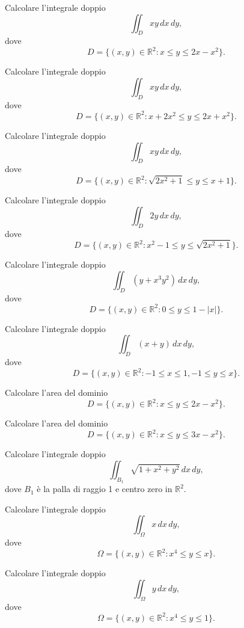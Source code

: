 \begin{exercise}
	Calcolare l'integrale doppio
	\[
	\iint_D xy \, dx \, dy,
	\]
	dove
	\[
	D = \{(x, y) \in \mathbb{R}^2 : x \leq y \leq 2x - x^2\}.
	\]
\end{exercise}
\begin{exercise}
	Calcolare l'integrale doppio
	\[
	\iint_D xy \, dx \, dy,
	\]
	dove
	\[
	D = \{(x, y) \in \mathbb{R}^2 : x + 2x^2 \leq y \leq 2x + x^2\}.
	\]
\end{exercise}
\begin{exercise}
	Calcolare l'integrale doppio
	\[
	\iint_D xy \, dx \, dy,
	\]
	dove
	\[
	D = \{(x, y) \in \mathbb{R}^2 : \sqrt{2x^2 + 1} \leq y \leq x + 1\}.
	\]
\end{exercise}
\begin{exercise}
	Calcolare l'integrale doppio
	\[
	\iint_D 2y \, dx \, dy,
	\]
	dove
	\[
	D = \{(x, y) \in \mathbb{R}^2 : x^2 - 1 \leq y \leq \sqrt{2x^2 + 1}\}.
	\]
\end{exercise}
\begin{exercise}
	Calcolare l'integrale doppio
	\[
	\iint_D (y + x^3 y^2) \, dx \, dy,
	\]
	dove
	\[
	D = \{(x, y) \in \mathbb{R}^2 : 0 \leq y \leq 1 - |x|\}.
	\]
\end{exercise}
\begin{exercise}
	Calcolare l'integrale doppio
	\[
	\iint_D (x + y) \, dx \, dy,
	\]
	dove
	\[
	D = \{(x, y) \in \mathbb{R}^2 : -1 \leq x \leq 1, -1 \leq y \leq x\}.
	\]
\end{exercise}
\begin{exercise}
	Calcolare l'area del dominio
	\[
	D = \{(x, y) \in \mathbb{R}^2 : x \leq y \leq 2x - x^2\}.
	\]
\end{exercise}
\begin{exercise}
	Calcolare l'area del dominio
	\[
	D = \{(x, y) \in \mathbb{R}^2 : x \leq y \leq 3x - x^2\}.
	\]
\end{exercise}
\begin{exercise}
	Calcolare l'integrale doppio
	\[
	\iint_{B_1} \sqrt{1 + x^2 + y^2} \, dx \, dy,
	\]
	dove \( B_1 \) è la palla di raggio 1 e centro zero in \( \mathbb{R}^2 \).
\end{exercise}
\begin{exercise}
	Calcolare l'integrale doppio
	\[
	\iint_\Omega x \, dx \, dy,
	\]
	dove
	\[
	\Omega = \{(x, y) \in \mathbb{R}^2 : x^4 \leq y \leq x\}.
	\]
\end{exercise}
\begin{exercise}
	Calcolare l'integrale doppio
	\[
	\iint_\Omega y \, dx \, dy,
	\]
	dove
	\[
	\Omega = \{(x, y) \in \mathbb{R}^2 : x^4 \leq y \leq 1\}.
	\]
\end{exercise}
